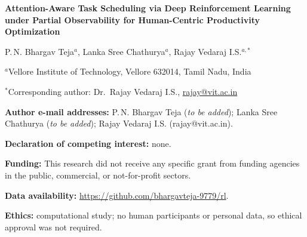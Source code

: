 \documentclass[11pt]{article}
\begin{document}
\begin{center}
{\Large\bfseries Attention-Aware Task Scheduling via Deep Reinforcement Learning under Partial Observability for Human-Centric Productivity Optimization\par}
\vspace{1.2cm}
{\large P.\,N. Bhargav Teja$^{a}$, Lanka Sree Chathurya$^{a}$, Rajay Vedaraj I.S.$^{a,*}$\par}
\vspace{0.6cm}
$^{a}$Vellore Institute of Technology, Vellore 632014, Tamil Nadu, India\par
\vspace{0.6cm}
$^{*}$Corresponding author: Dr.\ Rajay Vedaraj I.S., \href{mailto:rajay@vit.ac.in}{rajay@vit.ac.in}
\end{center}
\vspace{1cm}
\noindent\textbf{Author e-mail addresses:} P.\,N. Bhargav Teja (\textit{to be added}); Lanka Sree Chathurya (\textit{to be added}); Rajay Vedaraj I.S. (rajay@vit.ac.in).

\medskip
\noindent\textbf{Declaration of competing interest:} none.\par
\noindent\textbf{Funding:} This research did not receive any specific grant from funding agencies in the public, commercial, or not-for-profit sectors.\par
\noindent\textbf{Data availability:} \url{https://github.com/bhargavteja-9779/rl}.\par
\noindent\textbf{Ethics:} computational study; no human participants or personal data, so ethical approval was not required.\par
\end{document}
